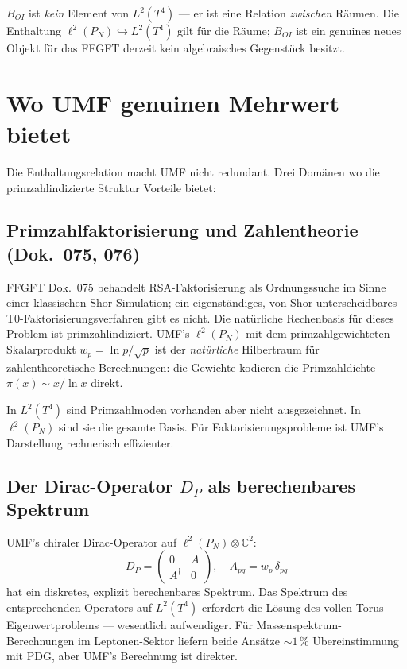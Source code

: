 $B_{OI}$ ist \emph{kein} Element von $L^2(T^4)$ — er ist eine Relation
\emph{zwischen} Räumen. Die Enthaltung $\ell^2(P_N) \hookrightarrow L^2(T^4)$
gilt für die Räume; $B_{OI}$ ist ein genuines neues Objekt für das FFGFT
derzeit kein algebraisches Gegenstück besitzt.

\section{Wo UMF genuinen Mehrwert bietet}

Die Enthaltungsrelation macht UMF nicht redundant. Drei Domänen wo die
primzahlindizierte Struktur Vorteile bietet:

\subsection{Primzahlfaktorisierung und Zahlentheorie (Dok.~075, 076)}

FFGFT Dok.~075 behandelt RSA-Faktorisierung als Ordnungssuche im Sinne
einer klassischen Shor-Simulation; ein eigenständiges, von Shor
unterscheidbares T0-Faktorisierungsverfahren gibt es nicht. Die natürliche
Rechenbasis für dieses Problem ist primzahlindiziert. UMF's $\ell^2(P_N)$ mit
dem primzahlgewichteten Skalarprodukt $w_p = \ln p/\sqrt{p}$ ist der
\emph{natürliche} Hilbertraum für zahlentheoretische Berechnungen: die Gewichte
kodieren die Primzahldichte $\pi(x) \sim x/\ln x$ direkt.

In $L^2(T^4)$ sind Primzahlmoden vorhanden aber nicht ausgezeichnet. In
$\ell^2(P_N)$ sind sie die gesamte Basis. Für Faktorisierungsprobleme ist
UMF's Darstellung rechnerisch effizienter.

\subsection{Der Dirac-Operator \texorpdfstring{$D_P$}{D\_P} als berechenbares Spektrum}

UMF's chiraler Dirac-Operator auf $\ell^2(P_N) \otimes \mathbb{C}^2$:
\begin{equation}
  D_P = \begin{pmatrix} 0 & A \\ A^\dagger & 0 \end{pmatrix},
  \quad A_{pq} = w_p\,\delta_{pq}
  \tag{244.5}
\end{equation}
hat ein diskretes, explizit berechenbares Spektrum. Das Spektrum des
entsprechenden Operators auf $L^2(T^4)$ erfordert die Lösung des vollen
Torus-Eigenwertproblems — wesentlich aufwendiger. Für Massenspektrum-
Berechnungen im Leptonen-Sektor liefern beide Ansätze $\sim 1\,\%$
Übereinstimmung mit PDG, aber UMF's Berechnung ist direkter.

